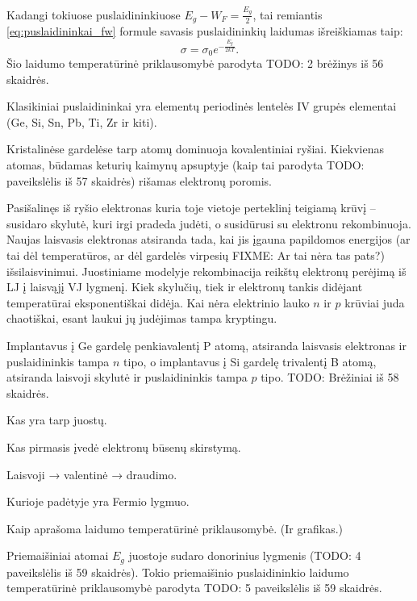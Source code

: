 Kadangi tokiuose puslaidininkiuose $E_{g} - W_{F} = \frac{E_{g}}{2}$,
tai remiantis \ref{eq:puslaidininkai_fw} formule savasis
puslaidininkių laidumas išreiškiamas taip:
\begin{equation*}
  \sigma = \sigma_{0} e^{-\frac{E_{g}}{2kT}}.
\end{equation*}
Šio laidumo temperatūrinė priklausomybė parodyta TODO: 2 brėžinys iš
56 skaidrės.

Klasikiniai puslaidininkai yra elementų periodinės lentelės IV grupės
elementai (Ge, Si, Sn, Pb, Ti, Zr ir kiti).

Kristalinėse gardelėse tarp atomų dominuoja kovalentiniai ryšiai.
Kiekvienas atomas, būdamas keturių kaimynų apsuptyje (kaip tai parodyta
TODO: paveikslėlis iš 57 skaidrės) rišamas elektronų poromis.

Pasišalinęs iš ryšio elektronas kuria toje vietoje perteklinį teigiamą
krūvį – susidaro skylutė, kuri irgi pradeda judėti, o susidūrusi
su elektronu rekombinuoja. Naujas laisvasis elektronas atsiranda
tada, kai jis įgauna papildomos energijos (ar tai dėl temperatūros,
ar dėl gardelės virpesių FIXME: Ar tai nėra tas pats?) išsilaisvinimui.
Juostiniame modelyje rekombinacija reikštų elektronų perėjimą iš LJ
į laisvąjį VJ lygmenį. Kiek skylučių, tiek ir elektronų tankis
didėjant temperatūrai eksponentiškai didėja. Kai nėra elektrinio lauko
$n$ ir $p$ krūviai juda chaotiškai, esant laukui jų judėjimas tampa
kryptingu.

Implantavus į Ge gardelę penkiavalentį P atomą, atsiranda laisvasis
elektronas ir puslaidininkis tampa $n$ tipo, o implantavus į
Si gardelę trivalentį B atomą, atsiranda laisvoji skylutė ir
puslaidininkis tampa $p$ tipo. TODO: Brėžiniai iš 58 skaidrės.

\begin{remember}
  \item Kas yra tarp juostų.
  \item Kas pirmasis įvedė elektronų būsenų skirstymą.
  \item Laisvoji → valentinė → draudimo.
  \item Kurioje padėtyje yra Fermio lygmuo.
  \item Kaip aprašoma laidumo temperatūrinė priklausomybė. (Ir grafikas.)
\end{remember}

Priemaišiniai atomai $E_{g}$ juostoje sudaro donorinius
lygmenis (TODO: 4 paveikslėlis iš 59 skaidrės). Tokio priemaišinio
puslaidininkio laidumo temperatūrinė priklausomybė
parodyta TODO: 5 paveikslėlis iš 59 skaidrės.

